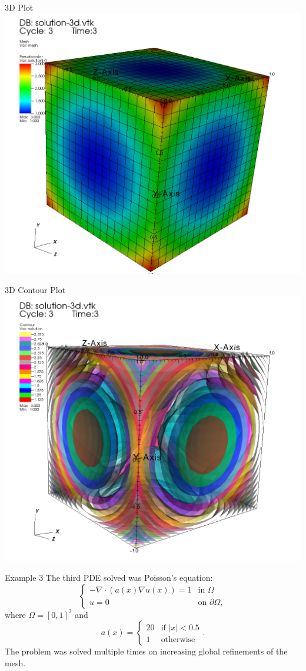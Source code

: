 \documentclass[9pt]{beamer}
\newcommand{\abs}[1]{\left\vert#1\right\vert}
\newcommand{\grad}{\nabla}
\begin{document}
\begin{frame}{3D Plot}
\centering
\includegraphics[scale=1]{Solu2-3d.png}
\end{frame}

\begin{frame}{3D Contour Plot}
\centering
\includegraphics[scale=1]{Solu2-3dcon.png}
\end{frame}

\begin{frame}{Example 3}
The third PDE solved was Poisson's equation:
$$
\begin{cases}
-\grad \cdot(a(x)\grad u(x)) = 1 &\text{in }\Omega\\
u = 0 & \text{on }\partial\Omega,
\end{cases}
$$
where $\Omega = [0,1]^2$ and 
$$
a(x) = \begin{cases}
20 & \text{if }\abs{x} < 0.5\\
1 & \text{otherwise}
\end{cases}.
$$ 
The problem was solved multiple times on increasing global refinements of the mesh.
\end{frame}
\end{document}
